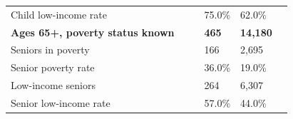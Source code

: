 \documentclass[9pt]{report}
\begin{document}
\begin{tabular}{p{.10in}p{.10in}p{.10in}p{3.7in}>{\hfill}p{.85in}>{\hfill}p{.85in}>{\hfill}p{.85in}>{\hfill}p{.85in}p{0.1in}}
\multicolumn{4}{l}{\parbox{3.6in}{\strut\raggedright{{Child low-income rate}}\strut}} &  &  & 75.0\% & 62.0\% & \multicolumn{1}{l}{}  \\ 
\multicolumn{4}{l}{\parbox{3.5in}{\strut\raggedright{\textbf{Ages 65+, poverty status known}\strut}}} & \textbf{} & \textbf{} & \textbf{465} & \textbf{14,180} & \textbf{} \\ 
\multicolumn{4}{l}{\parbox{3.6in}{\strut\raggedright{{Seniors in poverty}}\strut}} &  &  & 166 & 2,695 & \multicolumn{1}{l}{}  \\ 
\multicolumn{4}{l}{\parbox{3.6in}{\strut\raggedright{{Senior poverty rate}}\strut}} &  &  & 36.0\% & 19.0\% & \multicolumn{1}{l}{}  \\ 
\multicolumn{4}{l}{\parbox{3.6in}{\strut\raggedright{{Low-income seniors}}\strut}} &  &  & 264 & 6,307 & \multicolumn{1}{l}{}  \\ 
\multicolumn{4}{l}{\parbox{3.6in}{\strut\raggedright{{Senior low-income rate}}\strut}} &  &  & 57.0\% & 44.0\% & \multicolumn{1}{l}{}  \\ 

\end{tabular}
\setlength{\tabcolsep}{6pt} %
\end{document}

